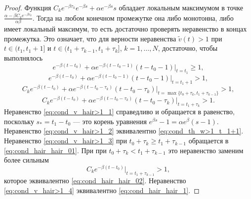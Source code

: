 \begin{proof}
	Функция $C_ke^{-\beta \tau_k}e^{-\beta s}+\alpha e^{-\beta s} s$ обладает локальным максимумом в точке $\frac{\alpha-\beta C_ke^{-\beta \tau_k}}{\alpha \beta}$.
	Тогда на любом конечном промежутке она либо монотонна, либо имеет локальный максимум, то есть достаточно проверять неравенство в концах промежутка. Это означает, что для верности неравенства $\tilde{v}(t)>1$ при $t\in(t_1,t_1+1]$ и  $t\in(t_1+\tau_{k-1},t_1+\tau_k]$, $k = 1,\ldots,N$,  достаточно, чтобы выполнялось  
	\begin{equation}
		\label{eq:cond_v_hair>1_1}
		e^{-\beta(t-t_0)}+\alpha e^{-\beta (t-t_0-1)} (t-t_0-1)|_{t=t_1}\geqslant 1,
	\end{equation}
	\begin{equation}
		\label{eq:cond_v_hair>1_2}
		e^{-\beta(t-t_0)}+\alpha e^{-\beta (t-t_0-1)} (t-t_0-1)|_{t=t_1+1}>1,
	\end{equation}
	\begin{equation}
		\label{eq:cond_v_hair>1_3}
		C_k e^{-\beta(t-t_0)}+\alpha e^{-\beta (t-t_0-\tau_k)} (t-t_0-\tau_k)|_{t=\max\{t_0+\tau_k,t_1+\tau_{k-1}\}}>1,
	\end{equation}
	\begin{equation}
		\label{eq:cond_v_hair>1_4}
		C_k e^{-\beta(t-t_0)}+\alpha e^{-\beta (t-t_0-\tau_k)} (t-t_0-\tau_k)|_{t=t_1+\tau_k}>1.
	\end{equation}
	Неравенство \eqref{eq:cond_v_hair>1_1} справедливо и обращается в равенство, поскольку $s_*=t_1-t_0$ --- это корень уравнения $e^{\beta s}-1=\alpha e^{\beta}(s-1)$. Неравенство \eqref{eq:cond_v_hair>1_2} эквивалентно \eqref{eq:cond_th_w>1_t_1+1}. Неравенство \eqref{eq:cond_v_hair>1_3} при $t_0+\tau_k\geqslant t_1+\tau_{k-1}$ обращается в \eqref{eq:cond_hair_hair_01}. При при $t_0+\tau_k<t_1+\tau_{k-1}$ это неравенство заменим более сильным
	\[C_ke^{-\beta(t-t_0)}|_{t=t_1+\tau_{k-1}}>1,\]
	которое эквивалентно \eqref{eq:cond_hair_hair_02}.
	Неравенство \eqref{eq:cond_v_hair>1_4} эквивалентно \eqref{eq:cond_hair_hair_1}.
	
\end{proof}

